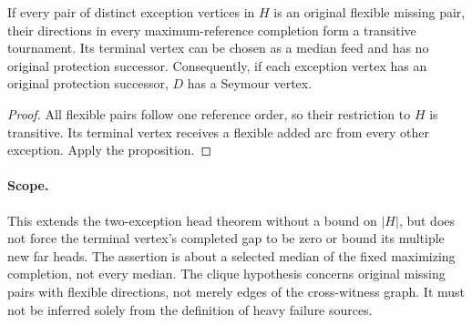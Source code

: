 \begin{corollary}
\label{cor:flexible-exception-clique-terminal-feed}
If every pair of distinct exception vertices in $H$ is an original
flexible missing pair, their directions in every maximum-reference
completion form a transitive tournament. Its terminal vertex can be
chosen as a median feed and has no original protection successor.
Consequently, if each exception vertex has an original protection
successor, $D$ has a Seymour vertex.
\end{corollary}
\begin{proof}
All flexible pairs follow one reference order, so their restriction
to $H$ is transitive. Its terminal vertex receives a flexible added
arc from every other exception. Apply the proposition.
\end{proof}

\paragraph{Scope.}
This extends the two-exception head theorem without a bound on
$|H|$, but does not force the terminal vertex's completed gap to be
zero or bound its multiple new far heads. The assertion is about a
selected median of the fixed maximizing completion, not every median.
The clique hypothesis concerns original missing pairs with flexible
directions, not merely edges of the cross-witness graph. It must not
be inferred solely from the definition of heavy failure sources.
